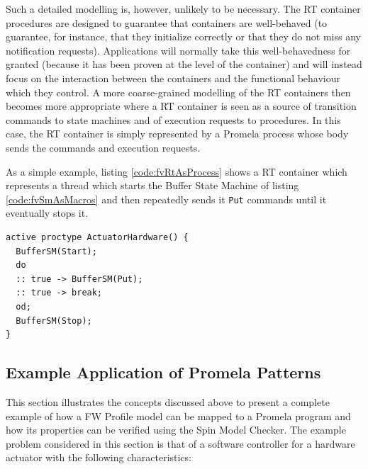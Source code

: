 \documentclass[definition]{../fwprofile}
\begin{document}
Such a detailed modelling is, however, unlikely to be necessary. The RT container procedures are designed to guarantee that containers are well-behaved (to guarantee, for instance, that they initialize correctly or that they do not miss any notification requests). Applications will normally take this well-behavedness for granted (because it has been proven at the level of the container) and will instead focus on the interaction between the containers and the functional behaviour which they control. A more coarse-grained modelling of the RT containers then becomes more appropriate where a RT container is seen as a source of transition commands to state machines and of execution requests to procedures. In this case, the RT container is simply represented by a Promela process whose body sends the commands and execution requests.

As a simple example, listing \ref{code:fvRtAsProcess} shows a RT container which represents a thread which starts the Buffer State Machine of listing \ref{code:fvSmAsMacros} and then repeatedly sends it \texttt{Put} commands until it eventually stops it. 

\begin{lstlisting}
active proctype ActuatorHardware() {
  BufferSM(Start);
  do
  :: true -> BufferSM(Put);
  :: true -> break;
  od;
  BufferSM(Stop);
} 
\end{lstlisting}

\subsection{Example Application of Promela Patterns}\label{sec:promelaPatternsExample}
This section illustrates the concepts discussed above to present a complete example of how a FW Profile model can be mapped to a Promela program and how its properties can be verified using the Spin Model Checker. The example problem considered in this section is that of a software controller for a hardware actuator with the following characteristics:  
\end{document}
